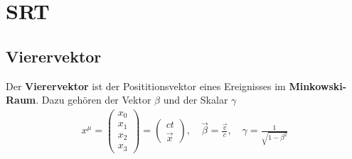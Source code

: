 \section{SRT}
\subsection{Vierervektor}
Der \textbf{Vierervektor} ist der Posititionsvektor eines Ereignisses im \textbf{Minkowski-Raum}. Dazu gehören der Vektor $\beta$ und der Skalar $\gamma$
\begin{align*}
    x^{\mu} = \begin{pmatrix}
        x_0\\
        x_1\\
        x_2\\
        x_3
    \end{pmatrix} = \begin{pmatrix}
        ct\\
        \vec{x}
    \end{pmatrix}, \quad \vec{\beta} = \frac{\vec{v}}{c}, \quad \gamma = \frac{1}{\sqrt{1 - \beta^2}}
\end{align*}


